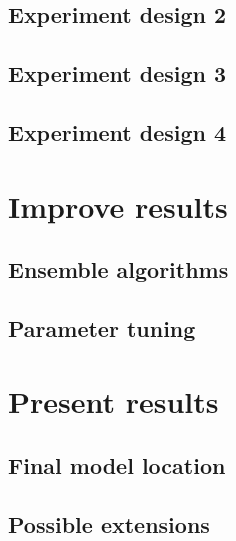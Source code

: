 \section{Experiment design 2}
\section{Experiment design 3}
\section{Experiment design 4}

\chapter{Improve results}

\section{Ensemble algorithms}
\section{Parameter tuning}

\chapter{Present results}
\section{Final model location}
\section{Possible extensions}
